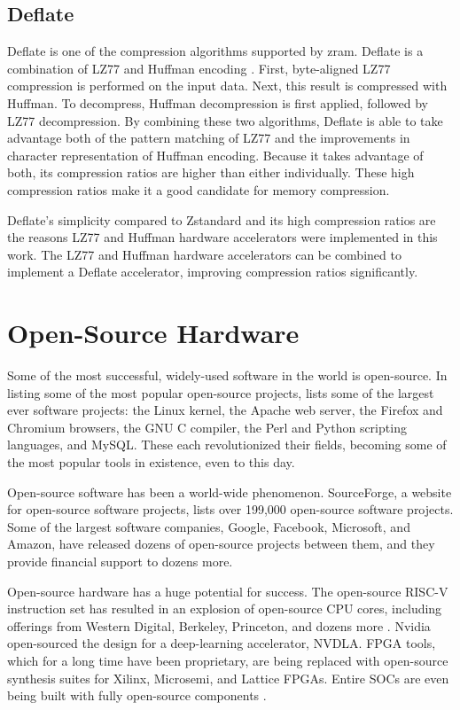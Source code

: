 \documentclass[doublespace,nopageskip]{VTthesis}
\begin{document}
\subsection{Deflate}\label{ss:deflate}
Deflate is one of the compression algorithms supported by zram. Deflate is a combination of LZ77 and Huffman encoding \cite{deflate}. First, byte-aligned LZ77 compression is performed on the input data. Next, this result is compressed with Huffman. To decompress, Huffman decompression is first applied, followed by LZ77 decompression. By combining these two algorithms, Deflate is able to take advantage both of the pattern matching of LZ77 and the improvements in character representation of Huffman encoding. Because it takes advantage of both, its compression ratios are higher than either individually. These high compression ratios make it a good candidate for memory compression.

Deflate's simplicity compared to Zstandard and its high compression ratios are the reasons LZ77 and Huffman hardware accelerators were implemented in this work. The LZ77 and Huffman hardware accelerators can be combined to implement a Deflate accelerator, improving compression ratios significantly.

\section{Open-Source Hardware}\label{se:open-source_motivation}
Some of the most successful, widely-used software in the world is open-source. In listing some of the most popular open-source projects, \cite{oss2.0} lists some of the largest ever software projects: the Linux kernel, the Apache web server, the Firefox and Chromium browsers, the GNU C compiler, the Perl and Python scripting languages, and MySQL. These each revolutionized their fields, becoming some of the most popular tools in existence, even to this day.

Open-source software has been a world-wide phenomenon. SourceForge, a website for open-source software projects, lists over 199,000 open-source software projects. Some of the largest software companies, Google, Facebook, Microsoft, and Amazon, have released dozens of open-source projects between them, and they provide financial support to dozens more.

Open-source hardware has a huge potential for success. The open-source RISC-V instruction set has resulted in an explosion of open-source CPU cores, including offerings from Western Digital, Berkeley, Princeton, and dozens more \cite{boom, blackparrot, openpiton}. Nvidia open-sourced the design for a deep-learning accelerator, NVDLA. FPGA tools, which for a long time have been proprietary, are being replaced with open-source synthesis suites for Xilinx, Microsemi, and Lattice FPGAs. Entire SOCs are even being built with fully open-source components \cite{litex}.
\end{document}

